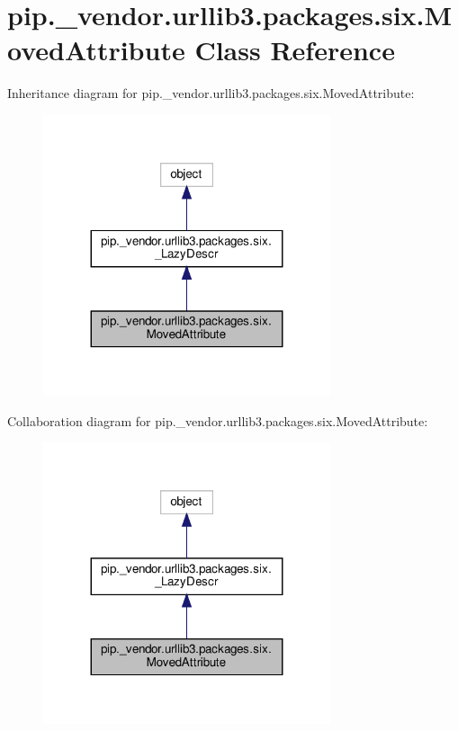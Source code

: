 \hypertarget{classpip_1_1__vendor_1_1urllib3_1_1packages_1_1six_1_1MovedAttribute}{}\section{pip.\+\_\+vendor.\+urllib3.\+packages.\+six.\+Moved\+Attribute Class Reference}
\label{classpip_1_1__vendor_1_1urllib3_1_1packages_1_1six_1_1MovedAttribute}


Inheritance diagram for pip.\+\_\+vendor.\+urllib3.\+packages.\+six.\+Moved\+Attribute\+:
\nopagebreak
\begin{figure}[H]
\begin{center}
\leavevmode
\includegraphics[width=239pt]{classpip_1_1__vendor_1_1urllib3_1_1packages_1_1six_1_1MovedAttribute__inherit__graph}
\end{center}
\end{figure}


Collaboration diagram for pip.\+\_\+vendor.\+urllib3.\+packages.\+six.\+Moved\+Attribute\+:
\nopagebreak
\begin{figure}[H]
\begin{center}
\leavevmode
\includegraphics[width=239pt]{classpip_1_1__vendor_1_1urllib3_1_1packages_1_1six_1_1MovedAttribute__coll__graph}
\end{center}
\end{figure}
